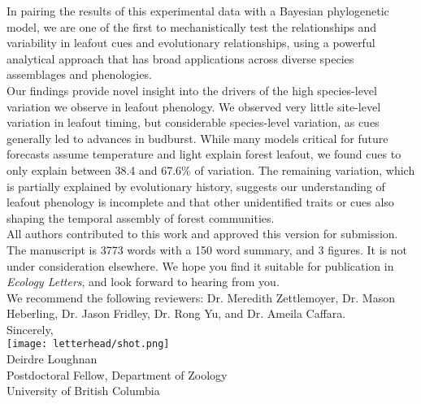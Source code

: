 \documentclass[11pt,a4paper]{article}
\begin{document}
In pairing the results of this experimental data with a Bayesian phylogenetic model, we are one of the first to mechanistically test the relationships and variability in leafout cues and evolutionary relationships, using a powerful analytical approach that has broad applications across diverse species assemblages and phenologies.
\vspace{1.5ex}\\
\noindent  Our findings provide novel insight into the drivers of the high species-level variation we observe in leafout phenology. We observed very little site-level variation in leafout timing, but considerable species-level variation, as cues generally led to advances in budburst.  While many models critical for future forecasts assume temperature and light explain forest leafout, we found cues to only explain between 38.4 and 67.6\% of variation. The remaining variation, which is partially explained by evolutionary history, suggests our understanding of leafout phenology is incomplete and that other unidentified traits or cues also shaping the temporal assembly of forest communities. %
\vspace{1.5ex}\\ 
\noindent All authors contributed to this work and approved this version for submission. The manuscript is 3773 words with a 150 word summary, and 3 figures. It is not under consideration elsewhere. We hope you find it suitable for publication in \emph{Ecology Letters}, and look forward to hearing from you. 
\vspace{1.5ex}\\
\noindent We recommend the following reviewers: Dr. Meredith Zettlemoyer, Dr. Mason Heberling, Dr. Jason Fridley, Dr. Rong Yu, and Dr. Ameila Caffara. 
\vspace{1.5ex}\\
\noindent Sincerely, \\
\texttt{[image: letterhead/shot.png]} \\ %
\noindent Deirdre Loughnan\\
\noindent Postdoctoral Fellow, Department of Zoology\\
\noindent University of British Columbia

\newpage

\vspace{-5ex}
% 


\newpage
\end{document}
